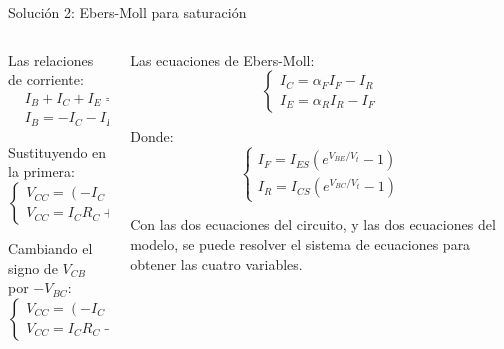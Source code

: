 \documentclass[t,aspectratio=169]{beamer}
\begin{document}
\begin{frame}{Solución 2: Ebers-Moll para saturación}

\begin{columns}

\begin{column}{0.5\textwidth}

Las relaciones de corriente:
\begin{align*}
&I_B + I_C + I_E = 0 \\
&I_B = - I_C - I_E
\end{align*}

Sustituyendo en la primera:
\begin{equation*}
\begin{cases}
    V_{CC} = (- I_C - I_E) R_B + V_{BE} \\
    V_{CC} = I_C R_C + V_{CB} + V_{BE}
\end{cases}
\end{equation*}

Cambiando el signo de $V_{CB}$ por $-V_{BC}$:
\begin{equation*}
\begin{cases}
    V_{CC} = (- I_C - I_E) R_B + V_{BE} \\
    V_{CC} = I_C R_C - V_{BC} + V_{BE}
\end{cases}
\end{equation*}

\end{column}

\begin{column}{0.5\textwidth}

Las ecuaciones de Ebers-Moll:
\begin{equation*}
\begin{cases}
I_C = \alpha_F I_F - I_R \\
I_E = \alpha_R I_R - I_F
\end{cases}
\end{equation*}

Donde:
\begin{equation*}
\begin{cases}
I_F = I_{ES} (e^{V_{BE}/V_t} - 1) \\
I_R = I_{CS} (e^{V_{BC}/V_t} - 1)
\end{cases}
\end{equation*}

Con las dos ecuaciones del circuito, y las dos ecuaciones del modelo, se puede resolver el sistema de ecuaciones para obtener las cuatro variables.

\end{column}

\end{columns}

\end{frame}
\end{document}
